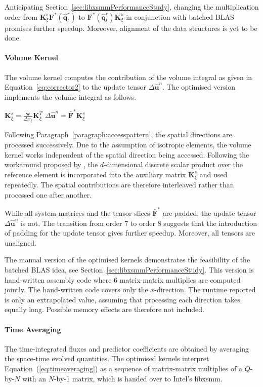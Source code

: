 \documentclass{acm_proc_article-sp}
\begin{document}
Anticipating Section~\ref{sec:libxsmmPerformanceStudy}, changing the multiplication order from $\mathbf{K}_{\xi}^s \mathbf{F}^*(\hat{\mathbf{q}}_l^r)$ to $\mathbf{F}^*(\hat{\mathbf{q}}_l^r) \mathbf{K}_{\xi}^s$ in conjunction with batched BLAS promises further speedup. Moreover, alignment of the data structures is yet to be done.

\paragraph{Volume Kernel}
The volume kernel computes the contribution of the volume integral as given in Equation~\ref{eq:corrector2} to the update tensor $\Delta \hat{\mathbf{u}}^n$. The optimised version implements the volume integral as follows.

\begin{algorithmic}
  \State $\mathbf{K}_{\xi}^s = \frac{\mathbf{w}}{\Delta x_\xi} \mathbf{K}_{\xi}^T$
\State $\Delta \hat{\mathbf{u}}^n = \bar{\mathbf{F}}^* \mathbf{K}_{\xi}^s$
\end{algorithmic}

Following Paragraph~\ref{paragraph:accesspattern}, the spatial directions are processed successively.
Due to the assumption of isotropic elements, the volume kernel works independent of the spatial direction being accessed. Following the workaround proposed by \cite{libxsmmconversation}, the $d$-dimensional discrete scalar product over the reference element is incorporated into the auxiliary matrix $\mathbf{K}_{\xi}^s$ and used repeatedly. The spatial contributions are therefore interleaved rather than processed one after another.

While all system matrices and the tensor slices $\bar{\mathbf{F}}^*$ are padded, the update tensor $\Delta \hat{\mathbf{u}}^n$ is not. The transition from order 7 to order 8 suggests that the introduction of padding for  the update tensor gives further speedup. Moreover, all tensors are unaligned.

The manual version of the optimised kernels demonstrates the feasibility of the batched BLAS idea, see Section~\ref{sec:libxsmmPerformanceStudy}. This version is hand-written assembly code where 6 matrix-matrix multiplies are computed jointly. The hand-written code covers only the $x$-direction. The runtime reported is only an extrapolated value, assuming that processing each direction takes equally long. Possible memory effects are therefore not included.


\paragraph{Time Averaging}
The time-integrated fluxes and predictor coefficients are obtained by averaging the space-time evolved quantities. The optimised kernels interpret Equation~(\ref{eq:timeaveraging}) as a sequence of matrix-matrix multiplies of a $Q$-by-$N$ with an $N$-by-1 matrix, which is handed over to Intel's libxsmm. 
\end{document}
